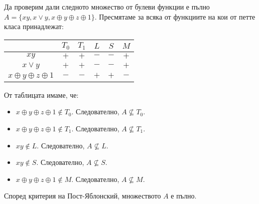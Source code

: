 \begin{example}
  Да проверим дали следното множество от булеви функции е пълно
  $A = \{xy, x\vee y, x\oplus y\oplus z\oplus 1\}$.
  Пресмятаме за всяка от функциите на кои от петте класа принадлежат:
  \newline
  \newline
  \begin{tabular}[b]{|c|c|c|c|c|c|}
    \hline
    & $T_0$ & $T_1$ & $L$ & $S$ & $M$\\
    \hline
    $xy$ & $+$ & $+$ & $-$ & $-$ & $+$\\
    \hline
    $x\vee y$ & $+$ & $+$ & $-$ & $-$ & $+$\\
    \hline
    $x\oplus y\oplus z\oplus 1$ & $-$ & $-$ & $+$ & $+$ & $-$ \\
    \hline
  \end{tabular}
  \newline
  
  От таблицата имаме, че:
  \begin{itemize}
  \item 
    $x \oplus y \oplus z \oplus 1 \not\in T_0$. Следователно, $A \not\subseteq T_0$.
  \item 
    $x \oplus y \oplus z \oplus 1 \not\in T_1$. Следователно, $A \not\subseteq T_1$.
  \item
    $xy \not\in L$. Следователно, $A \not\subseteq L$.
  \item
    $xy \not\in S$. Следователно, $A \not\subseteq S$.
  \item
    $x \oplus y \oplus z \oplus 1 \not\in M$. Следователно, $A \not\subseteq M$.
  \end{itemize}
  Според критерия на Пост-Яблонский, множеството $A$ е пълно.
\end{example}


